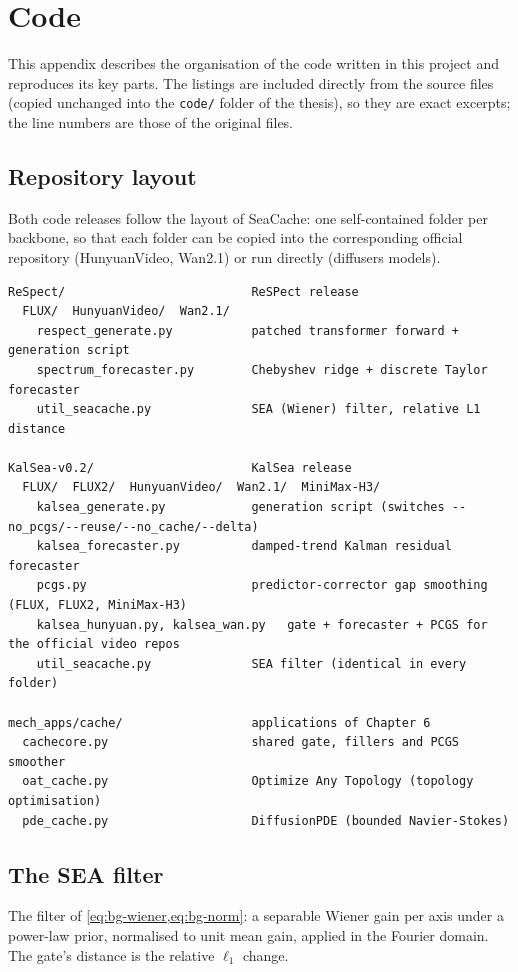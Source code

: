 \chapter{Code}\label{app:code}

This appendix describes the organisation of the code written in this project and reproduces its key parts. The listings are included directly from the source files (copied unchanged into the \texttt{code/} folder of the thesis), so they are exact excerpts; the line numbers are those of the original files.

\section{Repository layout}\label{sec:app-layout}

Both code releases follow the layout of SeaCache: one self-contained folder per backbone, so that each folder can be copied into the corresponding official repository (HunyuanVideo, Wan2.1) or run directly (diffusers models).

\begin{lstlisting}[language={},numbers=none]
ReSpect/                          ReSPect release
  FLUX/  HunyuanVideo/  Wan2.1/
    respect_generate.py           patched transformer forward + generation script
    spectrum_forecaster.py        Chebyshev ridge + discrete Taylor forecaster
    util_seacache.py              SEA (Wiener) filter, relative L1 distance

KalSea-v0.2/                      KalSea release
  FLUX/  FLUX2/  HunyuanVideo/  Wan2.1/  MiniMax-H3/
    kalsea_generate.py            generation script (switches --no_pcgs/--reuse/--no_cache/--delta)
    kalsea_forecaster.py          damped-trend Kalman residual forecaster
    pcgs.py                       predictor-corrector gap smoothing (FLUX, FLUX2, MiniMax-H3)
    kalsea_hunyuan.py, kalsea_wan.py   gate + forecaster + PCGS for the official video repos
    util_seacache.py              SEA filter (identical in every folder)

mech_apps/cache/                  applications of Chapter 6
  cachecore.py                    shared gate, fillers and PCGS smoother
  oat_cache.py                    Optimize Any Topology (topology optimisation)
  pde_cache.py                    DiffusionPDE (bounded Navier-Stokes)
\end{lstlisting}

\section{The SEA filter}\label{sec:app-sea}
The filter of \cref{eq:bg-wiener,eq:bg-norm}: a separable Wiener gain per axis under a power-law prior, normalised to unit mean gain, applied in the Fourier domain. The gate's distance is the relative $\ell_1$ change.

